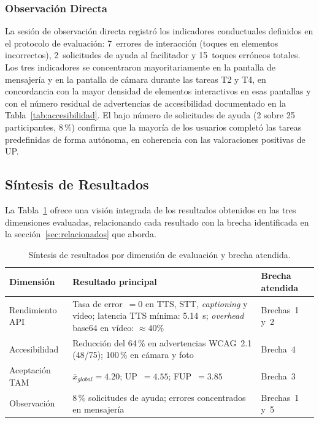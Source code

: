 \documentclass[journal]{IEEEtran}
\begin{document}
	\subsubsection{Observaci\'on Directa}
	La sesi\'on de observaci\'on directa registr\'o los indicadores conductuales definidos en el protocolo de evaluaci\'on: 7~errores de interacci\'on (toques en elementos incorrectos), 2~solicitudes de ayuda al facilitador y 15~toques err\'oneos totales. Los tres indicadores se concentraron mayoritariamente en la pantalla de mensajer\'ia y en la pantalla de c\'amara durante las tareas T2 y T4, en concordancia con la mayor densidad de elementos interactivos en esas pantallas y con el n\'umero residual de advertencias de accesibilidad documentado en la Tabla~\ref{tab:accesibilidad}. El bajo n\'umero de solicitudes de ayuda (2 sobre 25 participantes, 8\,\%) confirma que la mayor\'ia de los usuarios complet\'o las tareas predefinidas de forma aut\'onoma, en coherencia con las valoraciones positivas de UP.
	
	\subsection{S\'intesis de Resultados}
	La Tabla~\ref{tab:sintesis} ofrece una visi\'on integrada de los resultados obtenidos en las tres dimensiones evaluadas, relacionando cada resultado con la brecha identificada en la secci\'on~\ref{sec:relacionados} que aborda.
	
	\begin{table}[!t]
		\caption{S\'intesis de resultados por dimensi\'on de evaluaci\'on y brecha atendida.}
		\label{tab:sintesis}
		\centering
		\renewcommand{\arraystretch}{1.25}
		\begin{tabular}{p{2.0cm}p{2.8cm}p{2.5cm}}
			\toprule
			\textbf{Dimensi\'on} & \textbf{Resultado principal} & \textbf{Brecha atendida} \\
			\midrule
			Rendimiento API   & Tasa de error~$=0$ en TTS, STT, \textit{captioning} y v\'ideo; latencia TTS m\'inima: 5.14~s; \textit{overhead} base64 en v\'ideo: ${\approx}40\%$ & Brechas~1 y~2 \\
			Accesibilidad    & Reducci\'on del 64\,\% en advertencias WCAG~2.1 (48/75); 100\,\% en c\'amara y foto & Brecha~4 \\
			Aceptaci\'on TAM & $\bar{x}_{global}=4.20$; UP~$=4.55$; FUP~$=3.85$ & Brecha~3 \\
			Observaci\'on    & 8\,\% solicitudes de ayuda; errores concentrados en mensajer\'ia & Brechas~1 y~5 \\
			\bottomrule
		\end{tabular}
	\end{table}
	
\end{document}
